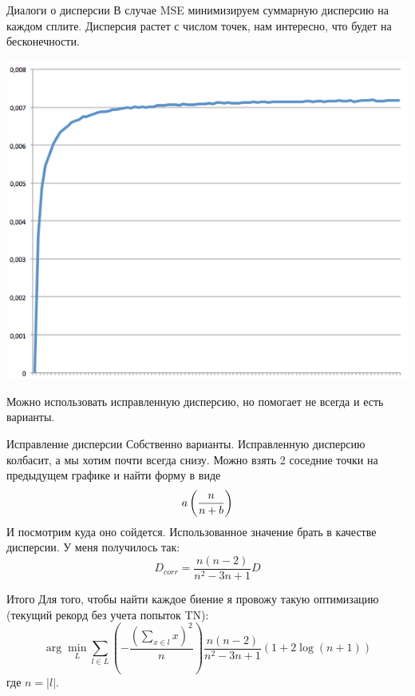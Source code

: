 \documentclass[14pt, fleqn, xcolor={dvipsnames, table}]{beamer}
\begin{document}
\begin{frame}{Диалоги о дисперсии}
\small
В случае MSE минимизируем суммарную дисперсию на каждом сплите. Дисперсия растет с числом точек, нам интересно, что будет на бесконечности.
\begin{center}
\includegraphics[height=0.5\textheight]{D.png} 
\end{center}
Можно использовать исправленную дисперсию, но помогает не всегда и есть варианты.
\end{frame}

\begin{frame}{Исправление дисперсии}
Собственно варианты. Исправленную дисперсию колбасит, а мы хотим почти всегда снизу. Можно взять 2 соседние точки на предыдущем графике и найти форму в виде
$$
a\left(n \over n + b\right)
$$
И посмотрим куда оно сойдется. Использованное значение брать в качестве дисперсии. У меня получилось так:
$$
D_{corr} = \frac{n (n - 2)}{n^2 - 3n +1} D
$$
\end{frame}

\begin{frame}{Итого}
Для того, чтобы найти каждое биение я провожу такую оптимизацию (текущий рекорд без учета попыток TN):
$$
\arg \min_{L} \sum_{l \in L} \left(- \frac{\left(\sum_{x \in l}x\right)^2}{n}\right)\frac{n (n - 2)}{n^2 - 3n +1} \left(1 + 2 \log(n + 1)\right)
$$
где $n = |l|$.
\end{frame}
\end{document}
